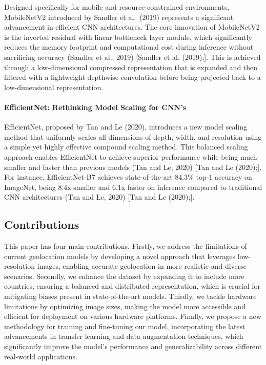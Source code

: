 Designed specifically for mobile and resource-constrained environments,
MobileNetV2 introduced by Sandler et al.~(2019) represents a significant
advancement in efficient CNN architectures. The core innovation of
MobileNetV2 is the inverted residual with linear bottleneck layer
module, which significantly reduces the memory footprint and
computational cost during inference without sacrificing accuracy
(Sandler et al., 2019) {[}Sandler et al. (2019);{]}. This is achieved
through a low-dimensional compressed representation that is expanded and
then filtered with a lightweight depthwise convolution before being
projected back to a low-dimensional representation.

\paragraph{EfficientNet: Rethinking Model Scaling for
CNN's}\label{efficientnet-rethinking-model-scaling-for-cnns}

EfficientNet, proposed by Tan and Le (2020), introduces a new model
scaling method that uniformly scales all dimensions of depth, width, and
resolution using a simple yet highly effective compound scaling method.
This balanced scaling approach enables EfficientNet to achieve superior
performance while being much smaller and faster than previous models
(Tan and Le, 2020) {[}Tan and Le (2020);{]}. For instance,
EfficientNet-B7 achieves state-of-the-art 84.3\% top-1 accuracy on
ImageNet, being 8.4x smaller and 6.1x faster on inference compared to
traditional CNN architectures (Tan and Le, 2020) {[}Tan and Le
(2020);{]}.

\subsection{Contributions}\label{contributions}

This paper has four main contributions. Firstly, we address the
limitations of current geolocation models by developing a novel approach
that leverages low-resolution images, enabling accurate geolocation in
more realistic and diverse scenarios. Secondly, we enhance the dataset
by expanding it to include more countries, ensuring a balanced and
distributed representation, which is crucial for mitigating biases
present in state-of-the-art models. Thirdly, we tackle hardware
limitations by optimizing image sizes, making the model more accessible
and efficient for deployment on various hardware platforms. Finally, we
propose a new methodology for training and fine-tuning our model,
incorporating the latest advancements in transfer learning and data
augmentation techniques, which significantly improve the model's
performance and generalizability across different real-world
applications.

